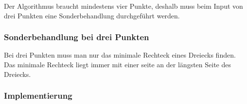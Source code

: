 \documentclass[10pt]{article}
\begin{document}
Der Algorithmus braucht mindestens vier Punkte, deshalb muss beim Input von drei Punkten eine Sonderbehandlung durchgeführt werden.

\subsubsection{Sonderbehandlung bei drei Punkten}
Bei drei Punkten muss man nur das minimale Rechteck eines Dreiecks finden. Das minimale Rechteck liegt immer mit einer seite an der längsten Seite des Dreiecks.

\subsubsection{Implementierung}


\end{document}
